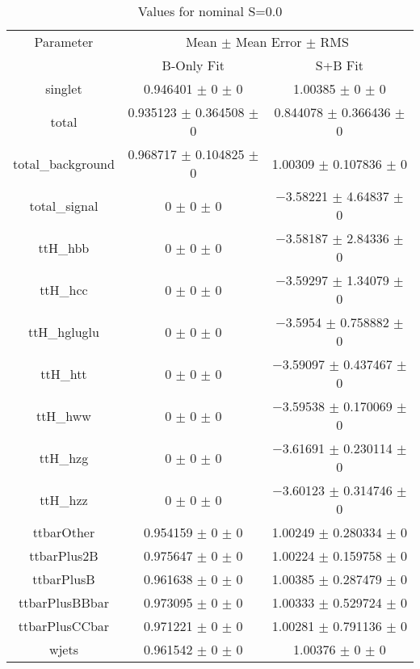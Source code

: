 \begin{table}
\centering
\caption{Values for nominal S=0.0}
\begin{tabular}{ccc}
\toprule
Parameter & \multicolumn{2}{c}{Mean $\pm$ Mean Error $\pm$ RMS}\\
 & B-Only Fit & S+B Fit\\
\midrule
singlet & \num{0.946401} $\pm$ \num{0} $\pm$ \num{0} & \num{1.00385} $\pm$ \num{0} $\pm$ \num{0}\\
total & \num{0.935123} $\pm$ \num{0.364508} $\pm$ \num{0} & \num{0.844078} $\pm$ \num{0.366436} $\pm$ \num{0}\\
total\_background & \num{0.968717} $\pm$ \num{0.104825} $\pm$ \num{0} & \num{1.00309} $\pm$ \num{0.107836} $\pm$ \num{0}\\
total\_signal & \num{0} $\pm$ \num{0} $\pm$ \num{0} & \num{-3.58221} $\pm$ \num{4.64837} $\pm$ \num{0}\\
ttH\_hbb & \num{0} $\pm$ \num{0} $\pm$ \num{0} & \num{-3.58187} $\pm$ \num{2.84336} $\pm$ \num{0}\\
ttH\_hcc & \num{0} $\pm$ \num{0} $\pm$ \num{0} & \num{-3.59297} $\pm$ \num{1.34079} $\pm$ \num{0}\\
ttH\_hgluglu & \num{0} $\pm$ \num{0} $\pm$ \num{0} & \num{-3.5954} $\pm$ \num{0.758882} $\pm$ \num{0}\\
ttH\_htt & \num{0} $\pm$ \num{0} $\pm$ \num{0} & \num{-3.59097} $\pm$ \num{0.437467} $\pm$ \num{0}\\
ttH\_hww & \num{0} $\pm$ \num{0} $\pm$ \num{0} & \num{-3.59538} $\pm$ \num{0.170069} $\pm$ \num{0}\\
ttH\_hzg & \num{0} $\pm$ \num{0} $\pm$ \num{0} & \num{-3.61691} $\pm$ \num{0.230114} $\pm$ \num{0}\\
ttH\_hzz & \num{0} $\pm$ \num{0} $\pm$ \num{0} & \num{-3.60123} $\pm$ \num{0.314746} $\pm$ \num{0}\\
ttbarOther & \num{0.954159} $\pm$ \num{0} $\pm$ \num{0} & \num{1.00249} $\pm$ \num{0.280334} $\pm$ \num{0}\\
ttbarPlus2B & \num{0.975647} $\pm$ \num{0} $\pm$ \num{0} & \num{1.00224} $\pm$ \num{0.159758} $\pm$ \num{0}\\
ttbarPlusB & \num{0.961638} $\pm$ \num{0} $\pm$ \num{0} & \num{1.00385} $\pm$ \num{0.287479} $\pm$ \num{0}\\
ttbarPlusBBbar & \num{0.973095} $\pm$ \num{0} $\pm$ \num{0} & \num{1.00333} $\pm$ \num{0.529724} $\pm$ \num{0}\\
ttbarPlusCCbar & \num{0.971221} $\pm$ \num{0} $\pm$ \num{0} & \num{1.00281} $\pm$ \num{0.791136} $\pm$ \num{0}\\
wjets & \num{0.961542} $\pm$ \num{0} $\pm$ \num{0} & \num{1.00376} $\pm$ \num{0} $\pm$ \num{0}\\
\bottomrule
\end{tabular}
\end{table}